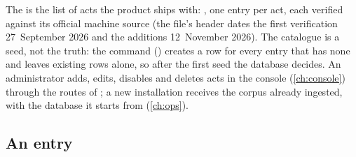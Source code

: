 The  is the list of acts the product ships with:
, one entry per act, each verified against its official machine
source (the file's header dates the first verification 27~September 2026 and the additions
12~November 2026). The catalogue is a seed, not the truth: the command
 () creates a
 row for every entry that has none and leaves existing rows alone, so
after the first seed the database decides. An administrator adds, edits, disables and deletes
acts in the console (\cref{ch:console}) through the routes of
; a new installation receives the corpus already ingested, with the
database it starts from (\cref{ch:ops}).

\subsection{An entry}\label{sec:corpus:entry}


